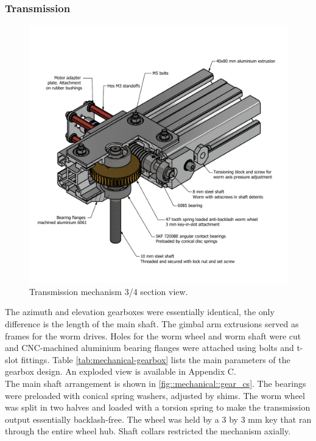 \subsubsection{Transmission}
\begin{figure}[H]
	\centering 
	\includegraphics[width=\textwidth]{4-experiment-design/img/mechanical/transmission.pdf}
	\caption{Transmission mechanism 3/4 section view. }
	\label{fig::mechanical::transmission}
\end{figure}

The azimuth and elevation gearboxes were essentially identical, the only difference is the length of the main shaft. The gimbal arm extrusions served as frames for the worm drives. Holes for the worm wheel and worm shaft were cut and CNC-machined aluminium bearing flanges were attached using bolts and t-slot fittings. Table \ref{tab:mechanical-gearbox} lists the main parameters of the gearbox design. An exploded view is available in Appendix C. \\


The main shaft arrangement is shown in \ref{fig::mechanical::gear_cs}. The bearings were preloaded with conical spring washers, adjusted by shims. The worm wheel was split in two halves and loaded with a torsion spring to make the transmission output essentially backlash-free. The wheel was held by a 3 by 3 mm key that ran through the entire wheel hub. Shaft collars restricted the mechanism axially.


